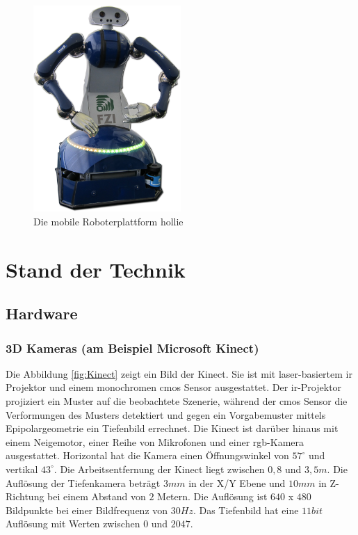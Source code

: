 \begin{figure}[h]
	\center
	\includegraphics[width=0.5\textwidth]{graphics/hollie}
	\caption{\label{fig:hollie} Die mobile Roboterplattform \gls{hollie}}
\end{figure}



\section{Stand der Technik}
\label{stand_der_technik_sec}

\subsection{Hardware}
\subsubsection{3D Kameras (am Beispiel Microsoft Kinect)}
Die Abbildung \ref{fig:Kinect} zeigt ein Bild der Kinect. Sie ist mit
 laser-basiertem \gls{ir} Projektor und einem monochromen \gls{cmos} Sensor ausgestattet.
 Der \gls{ir}-Projektor projiziert ein Muster auf die beobachtete Szenerie,
 während der \gls{cmos} Sensor die Verformungen des Musters detektiert und gegen
 ein Vorgabemuster mittels Epipolargeometrie ein Tiefenbild errechnet.
 Die Kinect ist darüber hinaus mit einem Neigemotor, einer Reihe von Mikrofonen
 und einer \gls{rgb}-Kamera ausgestattet. Horizontal hat die Kamera einen Öffnungswinkel
 von $57^\circ$ und vertikal $43^\circ$. Die Arbeitsentfernung der Kinect liegt
 zwischen $0,8$ und $3,5m$. Die Auflösung der Tiefenkamera beträgt $3mm$ in
 der X/Y Ebene und $10mm$ in Z-Richtung bei einem Abstand von $2$ Metern. Die
 Auflösung ist $640$ x $480$ Bildpunkte bei einer Bildfrequenz von $30Hz$. Das
 Tiefenbild hat eine $11bit$ Auflösung mit Werten zwischen $0$ und $2047$.

